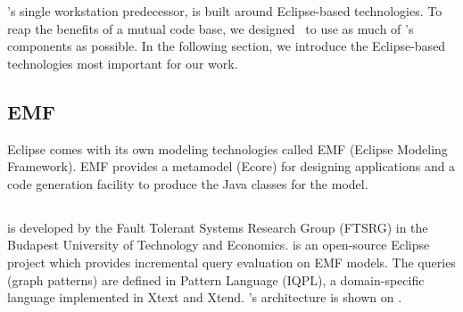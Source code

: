 \iqd{}'s single workstation predecessor, \eiq{} is built around Eclipse-based technologies. To reap the benefits of a mutual code base, we designed \iqd\ to use as much of \eiq's components as possible. In the following section, we introduce the Eclipse-based technologies most important for our work.

\subsection{EMF}
\label{subsec:EMF}

Eclipse comes with its own modeling technologies called EMF (Eclipse Modeling Framework). EMF provides a metamodel (Ecore) for designing applications and a code generation facility to produce the Java classes for the model.

\subsection{\eiq{}}
\label{subsec:eiq}

\eiq{} is developed by the Fault Tolerant Systems Research Group (FTSRG) in the Budapest University of Technology and Economics. \eiq{} is an open-source Eclipse project which provides incremental query evaluation on EMF models. The queries (graph patterns) are defined in \iq{} Pattern Language (IQPL), a domain-specific language implemented in Xtext and Xtend. \eiq{}'s architecture is shown on .


